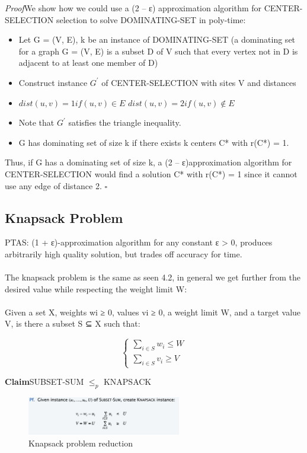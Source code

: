 \documentclass[11pt]{article}
\newenvironment{claim}[1]{\par\textbf{Claim}\space#1}{}
\newenvironment{proof}[1]{\par\textit{Proof}\space#1}{\hfill\ensuremath{\square}}
\begin{document}
\begin{proof}
We show how we could use a (2 – ε) approximation algorithm for CENTER-SELECTION selection to solve DOMINATING-SET in poly-time:
\begin{itemize}
\item{Let G = (V, E), k be an instance of DOMINATING-SET (a dominating set for a graph G = (V, E) is a subset D of V such that every vertex not in D is adjacent to at least one member of D)}
\item{Construct instance $G^{'}$ of CENTER-SELECTION with sites V and distances}
\item{$dist(u, v) = 1 if (u, v) \in E$ $dist(u, v) = 2 if (u, v) \notin E$}
\item{Note that $G^{'}$ satisfies the triangle inequality.}
\item{G has dominating set of size k if there exists k centers C* with r(C*) = 1.}
\end{itemize}

Thus, if G has a dominating set of size k, a (2 – ε)approximation algorithm for CENTER-SELECTION would find a solution C* with r(C*) = 1 since it cannot use any edge of distance 2.
\end{proof}

\subsection{Knapsack Problem}
PTAS: (1 + ε)-approximation algorithm for any constant ε > 0, produces arbitrarily high quality solution, but trades off accuracy for time.\\\\
The knapsack problem is the same as seen 4.2, in general we get further from the desired value while respecting the weight limit W:\\\\
Given a set X, weights wi ≥ 0, values vi ≥ 0, a weight limit W, and a target value V, is there a subset S ⊆ X such that:

\[\begin{cases} \sum_{i \in S} w_{i} \leq W \\  \sum_{i \in S} v_{i} \geq V \end{cases}\]

\begin{claim}
SUBSET-SUM $\leq _{p}$ KNAPSACK
\end{claim}

\begin{figure}[H]
		\centering
		\includegraphics[width=0.6\textwidth ]{NPKnapsack}
		\caption{Knapsack problem reduction}
\end{figure}
\end{document}

